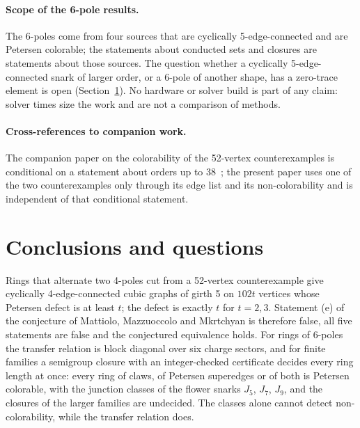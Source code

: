 \paragraph{Scope of the 6-pole results.} The 6-poles come from four sources that are cyclically 5-edge-connected and are Petersen colorable; the statements about conducted sets and
closures are statements about those sources. The question whether a cyclically 5-edge-connected snark of larger order, or a 6-pole of another shape, has a zero-trace element is open
(Section~\ref{sec:questions}). No hardware or solver build is part of any claim: solver times size the work and are not a comparison of methods.

\paragraph{Cross-references to companion work.} The companion paper on the colorability of the 52-vertex counterexamples is conditional on a statement about orders up to 38~\cite{COBI2026}; the present paper uses
one of the two counterexamples only through its edge list and its non-colorability and is independent of that conditional statement.

\section{Conclusions and questions}\label{sec:questions}

Rings that alternate two 4-poles cut from a 52-vertex counterexample give cyclically 4-edge-connected cubic graphs of girth 5 on $102t$ vertices whose Petersen defect is at least $t$; the defect is exactly $t$ for $t = 2, 3$. Statement
(e) of the conjecture of Mattiolo, Mazzuoccolo and Mkrtchyan is therefore false, all five statements are false and the conjectured equivalence holds. For rings of 6-poles the transfer relation is block diagonal over six charge sectors, and
for finite families a semigroup closure with an integer-checked certificate decides every ring length at once: every ring of claws, of Petersen superedges or of both is Petersen colorable, with the junction classes of the flower snarks $J_5$, $J_7$, $J_9$, and
the closures of the larger families are undecided. The classes alone cannot detect non-colorability, while the transfer relation does.

